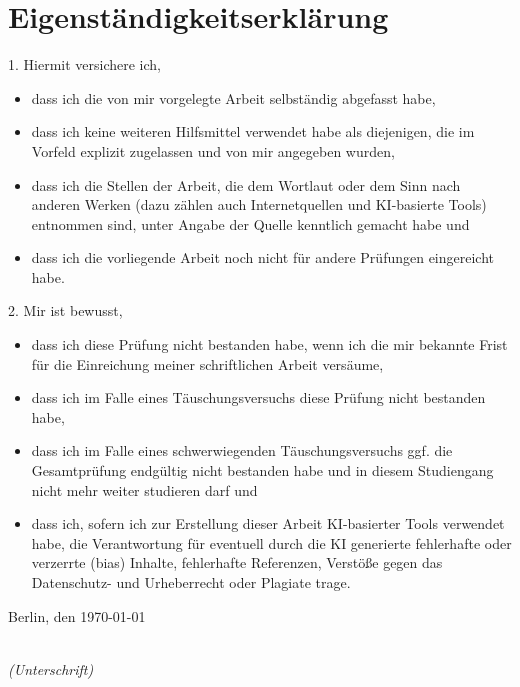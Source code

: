 \newpage
\thispagestyle{empty}
\noindent
\section*{Eigenständigkeitserklärung}
1. Hiermit versichere ich,
\begin{itemize}
    \item dass ich die von mir vorgelegte Arbeit selbständig abgefasst habe,
    \item dass ich keine weiteren Hilfsmittel verwendet habe als diejenigen, die im Vorfeld explizit zugelassen und von mir angegeben wurden,
    \item dass ich die Stellen der Arbeit, die dem Wortlaut oder dem Sinn nach anderen Werken (dazu zählen auch Internetquellen und KI-basierte Tools) entnommen sind, unter Angabe der Quelle kenntlich gemacht habe und
    \item dass ich die vorliegende Arbeit noch nicht für andere Prüfungen eingereicht habe.
\end{itemize}
2. Mir ist bewusst,
\begin{itemize}
    \item dass ich diese Prüfung nicht bestanden habe, wenn ich die mir bekannte Frist für die Einreichung meiner schriftlichen Arbeit versäume,
    \item dass ich im Falle eines Täuschungsversuchs diese Prüfung nicht bestanden habe,
    \item dass ich im Falle eines schwerwiegenden Täuschungsversuchs ggf. die Gesamtprüfung endgültig nicht bestanden habe und in diesem Studiengang nicht mehr weiter studieren darf und
    \item dass ich, sofern ich zur Erstellung dieser Arbeit KI-basierter Tools verwendet habe, die Verantwortung für eventuell durch die KI generierte fehlerhafte oder verzerrte (bias) Inhalte, fehlerhafte Referenzen, Verstöße gegen das Datenschutz- und Urheberrecht oder Plagiate trage.
\end{itemize}

\vspace{1cm}

\noindent
Berlin, den \today

\vspace{1cm}

\hspace*{7cm}%
\dotfill\\
\hspace*{8.5cm}%
\textit{(Unterschrift)}
